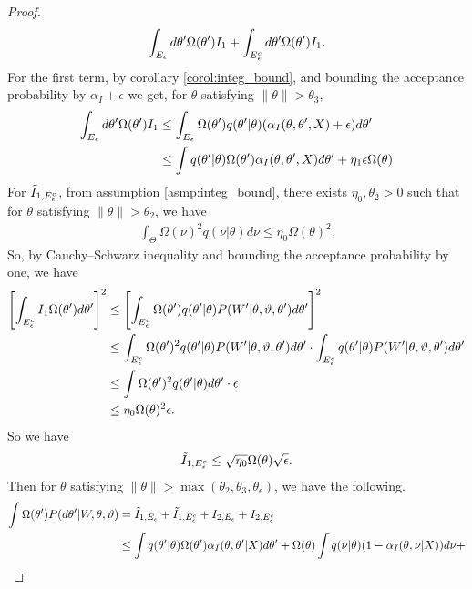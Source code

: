 \begin{proof}
$$\int_{E_\epsilon} d\theta' \Omega(\theta') I_1 +
\int_{E_\epsilon^c} d\theta' \Omega(\theta') I_1.
  $$
For the first term, by corollary \ref{corol:integ_bound}, and bounding
the acceptance probability by $\alpha_I + \epsilon$ we get, for $\theta$ satisfying $ \| \theta \| > \theta_3$,
\begin{align*}
\int_{E_\epsilon} d\theta' \Omega(\theta') I_1  &
 \leq \int_{E_\epsilon} \Omega(\theta')q(\theta' | \theta) (\alpha_I(\theta, \theta', X) + \epsilon) d\theta' \\
& \leq \int q(\theta' | \theta) \Omega(\theta')\alpha_I(\theta, \theta', X) d\theta' + \eta_1 \epsilon \Omega(\theta)
\end{align*}
For $\tilde{I}_{1,E^c_\epsilon}$, from assumption \ref{asmp:integ_bound}, there exists $\eta_0 , \theta_2 > 0$ such that for $\theta$ satisfying $ \| \theta \| > \theta_2$, we have
\begin{align*}
\int_\Theta \Omega(\nu)^2 q(\nu | \theta)d\nu \leq \eta_0 \Omega(\theta)^2.
\end{align*}
So, by Cauchy–Schwarz inequality and bounding the acceptance probability by one, we have
\begin{align*}
\left[  \int_{E_\epsilon^c} I_1 \Omega(\theta') d\theta' \right]^2
& \le \left[  \int_{E_\epsilon^c}  \Omega(\theta') q(\theta' | \theta) P(W' | \theta, \vartheta, \theta')d\theta' \right]^2\\
& \le \int_{E_\epsilon^c}  \Omega(\theta')^2 q(\theta' | \theta) P(W' | \theta, \vartheta, \theta')d\theta' \cdot \int_{E_\epsilon^c} q(\theta' | \theta) P(W' | \theta, \vartheta, \theta')d\theta' \\
& \le  \int  \Omega(\theta')^2 q(\theta' | \theta)d\theta' \cdot \epsilon \\
& \le  \eta_0 \Omega(\theta)^2 \epsilon.
\end{align*}
So we have
\begin{align*}
\tilde{I}_{1,E_\epsilon^c} \le \sqrt{\eta_0}\Omega(\theta) \sqrt{\epsilon}.
\end{align*}
Then for $\theta$ satisfying $ \| \theta \| >\max(\theta_2, \theta_3, \theta_\epsilon)$, we have the following.
\begin{align*}
  \int \Omega(\theta') P(d\theta'| W, \theta, \vartheta)
  &= \tilde{I}_{1,\E_\epsilon} + \tilde{I}_{1,\E^c_\epsilon} + I_{2,\E_{\epsilon}} + I_{2,\E_{\epsilon}^c} \\
  & \leq \int q(\theta' | \theta) \Omega(\theta')\alpha_I(\theta, \theta'| X) d\theta'  + \Omega(\theta)\int  q(\nu | \theta) (1 - \alpha_I(\theta, \nu | X)) d\nu+ \\

\end{align*}
\end{proof}
